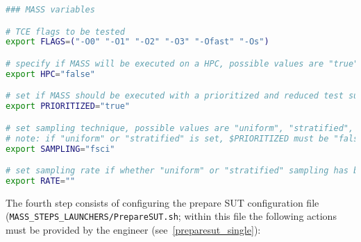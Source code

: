 \begin{lstlisting}[language=bash, label=mass_conf_specific, caption=\MASS specific variables. Excerpt of mass\_conf.sh file.]
### MASS variables

# TCE flags to be tested 
export FLAGS=("-O0" "-O1" "-O2" "-O3" "-Ofast" "-Os")

# specify if MASS will be executed on a HPC, possible values are "true" or "false"
export HPC="false"

# set if MASS should be executed with a prioritized and reduced test suite
export PRIORITIZED="true"

# set sampling technique, possible values are "uniform", "stratified", and "fsci"
# note: if "uniform" or "stratified" is set, $PRIORITIZED must be "false"
export SAMPLING="fsci"

# set sampling rate if whether "uniform" or "stratified" sampling has been selected
export RATE=""
\end{lstlisting}

The fourth step consists of configuring the prepare SUT configuration file \\(\texttt{MASS\_STEPS\_LAUNCHERS/PrepareSUT.sh}; within this file the following actions must be provided by the engineer (see~\ref{preparesut_single}):

